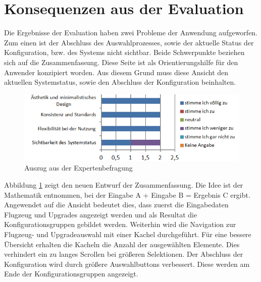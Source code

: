 \section{Konsequenzen aus der Evaluation}
Die Ergebnisse der Evaluation haben zwei Probleme der Anwendung aufgeworfen. Zum einen ist der Abschluss des Auswahlprozesses, sowie der aktuelle Status der Konfiguration, bzw. des Systems nicht sichtbar. Beide Schwerpunkte beziehen sich auf die Zusammenfassung. Diese Seite ist als Orientierungshilfe für den Anwender konzipiert worden. Aus diesem Grund muss diese Ansicht den aktuellen Systemstatus, sowie den Abschluss der Konfiguration beinhalten.  
\begin{figure}[H]
\includegraphics{images/bewertung_expert}
\caption{Auszug aus der Expertenbefragung}
\label{redesignSummary}
\end{figure}
Abbildung \ref{redesignSummary} zeigt den neuen Entwurf der Zusammenfassung. Die Idee ist der Mathematik entnommen, bei der Eingabe A + Eingabe B = Ergebnis C ergibt. Angewendet auf die Ansicht bedeutet dies, dass zuerst die Eingabedaten Flugzeug und Upgrades angezeigt werden und als Resultat die Konfigurationsgruppen gebildet werden. Weiterhin wird die Navigation zur Flugzeug- und Upgradeauswahl mit einer Kachel durchgeführt. Für eine bessere Übersicht erhalten die Kacheln die Anzahl der ausgewählten Elemente. Dies verhindert ein zu langes Scrollen bei größeren Selektionen. 
Der Abschluss der Konfiguration wird durch größere Auswahlbuttons verbessert. Diese werden am Ende der Konfigurationsgruppen angezeigt. 